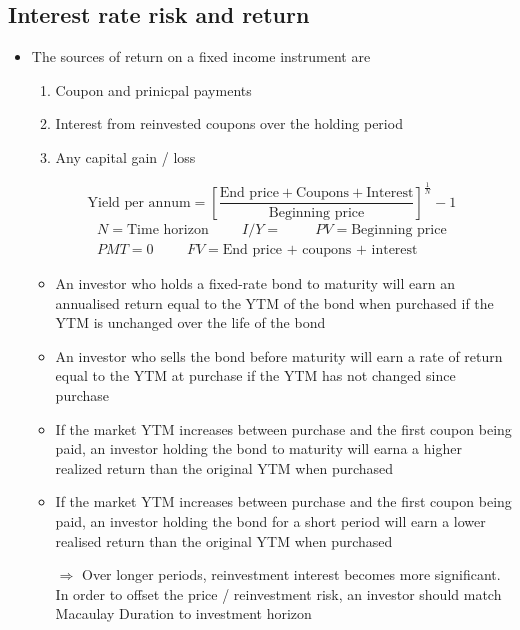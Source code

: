\documentclass[../notes_compiled.tex]{subfiles}
\begin{document}
\subsection{Interest rate risk and return}
\begin{itemize}
\item The sources of return on a fixed income instrument are
\begin{enumerate}
\item Coupon and prinicpal payments
\item Interest from reinvested coupons over the holding period
\item Any capital gain / loss
\end{enumerate}
\begin{equation}
\text{Yield per annum} = \left[ \frac{\text{End price} + \text{Coupons} + \text{Interest}}{\text{Beginning price}}\right]^{\frac{1}{N}} -1
\end{equation}
\begin{gather*}
N=\text{Time horizon} \hspace{1cm} I / Y = \hspace{1cm} PV =\text{Beginning price} \\
PMT=0 \hspace{1cm} FV=\text{End price + coupons + interest}
\end{gather*}
\begin{itemize}
\item An investor who holds a fixed-rate bond to maturity will earn an annualised return equal to the YTM of the bond when purchased if the YTM is unchanged over the life of the bond
\item An investor who sells the bond before maturity will earn a rate of return equal to the YTM at purchase if the YTM has not changed since purchase
\item If the market YTM increases between purchase and the first coupon being paid, an investor holding the bond to maturity will earna a higher realized return than the original YTM when purchased
\item If the market YTM increases between purchase and the first coupon being paid, an investor holding the bond for a short period will earn a lower realised return than the original YTM when purchased
\item[]
\item[$\Rightarrow$] Over longer periods, reinvestment interest becomes more significant. In order to offset the price / reinvestment risk, an investor should match Macaulay Duration to investment horizon
\end{itemize}
\end{itemize}
\end{document}
